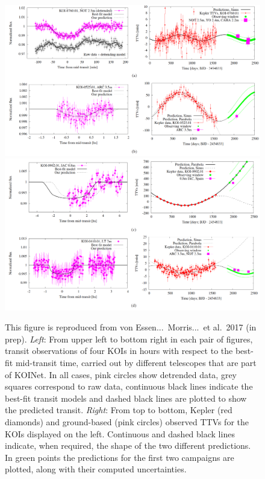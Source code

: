 
\begin{figure}
    \centering
    \includegraphics[scale=0.23]{koinet/caro1.png}
    \includegraphics[scale=0.23]{koinet/caro2.png}
    \caption{This figure is reproduced from von Essen...\ Morris...\ et al.~2017 (in prep). {\it Left}: From upper left to bottom right in each pair of figures, transit observations of four KOIs in hours with respect to the best-fit mid-transit time, carried out by different telescopes that are part of KOINet. In all cases, pink circles show detrended data, grey squares correspond to raw data, continuous black lines indicate the best-fit transit models and dashed black lines are plotted to show the predicted transit. {\it Right}: From top to bottom, Kepler (red diamonds) and ground-based (pink circles) observed TTVs for the KOIs displayed on the left. Continuous and dashed black lines indicate, when required, the shape of the two different predictions. In green points the predictions for the first two campaigns are plotted, along with their computed uncertainties.}
    \label{fig:koinet}
\end{figure}

